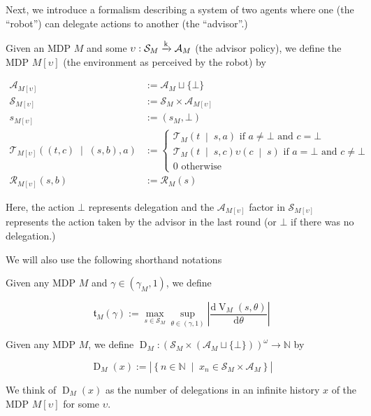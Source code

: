 \documentclass[anon,12pt]{colt2018} %
\newcommand{\AP}[1]{\left(#1\right)}
\newcommand{\AB}[1]{\left[#1\right]}
\newcommand{\APM}[2]{\left(#1\;\middle\vert\;#2\right)}
\newcommand{\ACM}[2]{\left\{#1\;\middle\vert\;#2\right\}}
\newcommand{\D}{\mathrm{d}}
\newcommand{\Nats}{\mathbb{N}}
\newcommand{\Abs}[1]{\left\vert #1 \right\vert}
\newcommand{\K}{\xrightarrow{\textnormal{k}}}
\newcommand{\A}{\mathcal{A}}
\newcommand{\St}{\mathcal{S}}
\newcommand{\T}{\mathcal{T}}
\newcommand{\R}{\mathcal{R}}
\newcommand{\V}{\operatorname{V}}
\newcommand{\MA}[2]{#1\AB{#2}}
\newcommand{\Tn}{\mathfrak{t}}
\newcommand{\Ad}{\upsilon}
\newcommand{\ND}{\operatorname{D}}
\begin{document}
Next, we introduce a formalism describing a system of two agents where one (the \enquote{robot}) can delegate actions to another (the \enquote{advisor}.)

\begin{samepage}
\begin{definition}

Given an MDP $M$ and some $\Ad: \St_M \K \A_M$ (the advisor policy), we define the MDP $\MA{M}{\Ad}$ (the environment as perceived by the robot) by

\begin{align}
\A_{\MA{M}{\Ad}}&:=\A_M \sqcup \{\bot\} \\
\St_{\MA{M}{\Ad}}&:=\St_M \times \A_{\MA{M}{\Ad}} \\ 
s_{\MA{M}{\Ad}}&:=\AP{s_M,\bot} \\
\T_{\MA{M}{\Ad}}\APM{\AP{t,c}}{\AP{s,b},a}&:=\begin{cases} \T_M\APM{t}{s,a} \text{ if } a\ne\bot \text{ and } c=\bot \\ \T_M\APM{t}{s,c}\Ad\APM{c}{s} \text{ if } a = \bot \text{ and } c\ne\bot \\ 0 \text{ otherwise} \end{cases} \\
\R_{\MA{M}{\Ad}}(s,b)&:= \R_M(s)
\end{align}

Here, the action $\bot$ represents delegation and the $\A_{\MA{M}{\Ad}}$ factor in $\St_{\MA{M}{\Ad}}$ represents the action taken by the advisor in the last round (or $\bot$ if there was no delegation.)

\end{definition}
\end{samepage}

We will also use the following shorthand notations

\begin{samepage}
\begin{definition}

Given any MDP $M$ and $\gamma\in\AP{\gamma_M,1}$, we define

\begin{equation}
\Tn_{M}(\gamma):=\max_{s \in \St_M} \sup_{\theta\in(\gamma,1)} \Abs{\frac{\D{\V_{M}(s,\theta)}}{\D{\theta}}}
\end{equation}

\end{definition}
\end{samepage}

\begin{samepage}
\begin{definition}

Given any MDP $M$, we define $\ND_M: \AP{\St_M \times \AP{\A_M \sqcup \{\bot\}}}^\omega \rightarrow \Nats$ by

\begin{equation}
\ND_M(x) := \Abs{\ACM{n\in\Nats}{x_n\in\St_M\times\A_M}} 
\end{equation}

We think of $\ND_M(x)$ as the number of delegations in an infinite history $x$ of the MDP $\MA{M}{\Ad}$ for some $\Ad$.

\end{definition}
\end{samepage}
\end{document}
